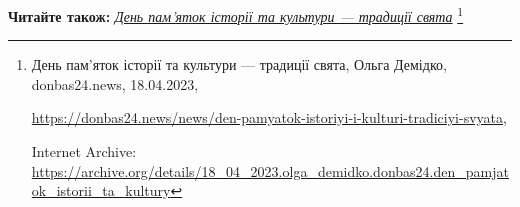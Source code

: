  
 
 
 
 


\textbf{Читайте також:} \href{https://archive.org/details/18_04_2023.olga_demidko.donbas24.den_pamjatok_istorii_ta_kultury}{\emph{День пам'яток історії та культури — традиції свята}}%
\footnote{День пам'яток історії та культури — традиції свята, Ольга Демідко, donbas24.news, 18.04.2023, \par%
\url{https://donbas24.news/news/den-pamyatok-istoriyi-i-kulturi-tradiciyi-svyata}, \par%
Internet Archive: \url{https://archive.org/details/18_04_2023.olga_demidko.donbas24.den_pamjatok_istorii_ta_kultury}%
}
